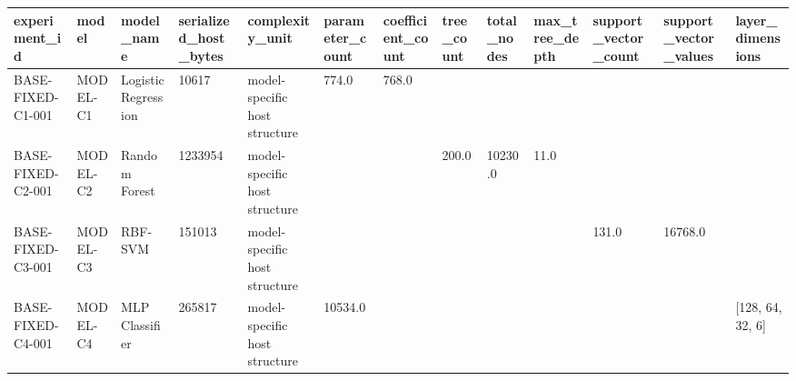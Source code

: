 \begin{tabular}{lllllllllllll}
 \hline
experiment\_id & model & model\_name & serialized\_host\_bytes & complexity\_unit & parameter\_count & coefficient\_count & tree\_count & total\_nodes & max\_tree\_depth & support\_vector\_count & support\_vector\_values & layer\_dimensions \\
 \hline
BASE-FIXED-C1-001 & MODEL-C1 & Logistic Regression & 10617 & model-specific host structure & 774.0 & 768.0 &  &  &  &  &  &  \\
BASE-FIXED-C2-001 & MODEL-C2 & Random Forest & 1233954 & model-specific host structure &  &  & 200.0 & 10230.0 & 11.0 &  &  &  \\
BASE-FIXED-C3-001 & MODEL-C3 & RBF-SVM & 151013 & model-specific host structure &  &  &  &  &  & 131.0 & 16768.0 &  \\
BASE-FIXED-C4-001 & MODEL-C4 & MLP Classifier & 265817 & model-specific host structure & 10534.0 &  &  &  &  &  &  & [128, 64, 32, 6] \\
 \hline
\end{tabular}
